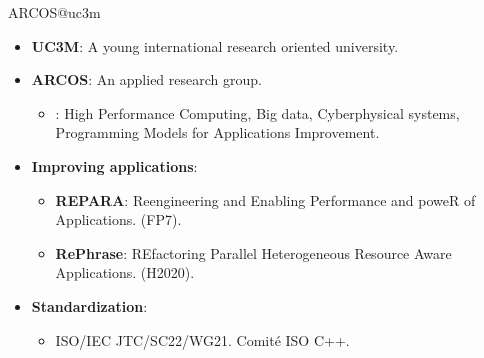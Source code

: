 \begin{frame}{ARCOS@uc3m}
\begin{itemize}
  \item \textbf{UC3M}: A young international research oriented university.
  \vfill
  \item \textbf{ARCOS}: An applied research group.
    \begin{itemize}
      \item {\color{blue}{Lines}}: 
            High Performance Computing,
            Big data,
            Cyberphysical systems,
            \alert{Programming Models for Applications Improvement}.
    \end{itemize} 
  \vfill
  \item \textbf{Improving applications}:
    \begin{itemize}
      \item \textbf{REPARA}: Reengineering and Enabling Performance and poweR of Applications.
            (FP7).
      \item \textbf{RePhrase}: REfactoring Parallel Heterogeneous Resource Aware Applications.
            (H2020).
    \end{itemize} 
  \vfill
  \item \textbf{Standardization}:
    \begin{itemize}
      \item ISO/IEC JTC/SC22/WG21. Comité ISO C++.
    \end{itemize}
\end{itemize}
\end{frame}
